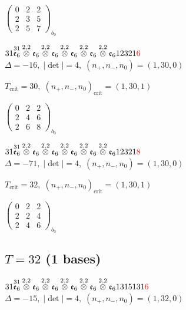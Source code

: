 \documentclass[10pt]{article}
\begin{document}
\hspace{2em}$\left(\begin{smallmatrix}0 & 2 & 2 \\ 2 & 3 & 5 \\ 2 & 5 & 7\end{smallmatrix}\right)_{\!b_0}$

$31\overset{31}{\mathfrak{e}_6}\overset{2,2}{\otimes}\mathfrak{e}_6\overset{2,2}{\otimes}\mathfrak{e}_6\overset{2,2}{\otimes}\mathfrak{e}_6\overset{2,2}{\otimes}\mathfrak{e}_6\overset{2,2}{\otimes}\mathfrak{e}_612321\textcolor{red}{6}$ \quad $\Delta=-16,\; |\det|=4,\; (n_+,n_-,n_0)=(1,30,0)$

\hspace{1em}$T_{\text{crit}}=30,\; (n_+,n_-,n_0)_{\text{crit}}=(1,30,1)$

\hspace{2em}$\left(\begin{smallmatrix}0 & 2 & 2 \\ 2 & 4 & 6 \\ 2 & 6 & 8\end{smallmatrix}\right)_{\!b_0}$

$31\overset{31}{\mathfrak{e}_6}\overset{2,2}{\otimes}\mathfrak{e}_6\overset{2,2}{\otimes}\mathfrak{e}_6\overset{2,2}{\otimes}\mathfrak{e}_6\overset{2,2}{\otimes}\mathfrak{e}_6\overset{2,2}{\otimes}\mathfrak{e}_612321\textcolor{red}{8}$ \quad $\Delta=-71,\; |\det|=4,\; (n_+,n_-,n_0)=(1,30,0)$

\hspace{1em}$T_{\text{crit}}=32,\; (n_+,n_-,n_0)_{\text{crit}}=(1,30,1)$

\hspace{2em}$\left(\begin{smallmatrix}0 & 2 & 2 \\ 2 & 2 & 4 \\ 2 & 4 & 6\end{smallmatrix}\right)_{\!b_0}$


\subsection*{$T = 32$ \quad (1 bases)}
\smallskip

$31\overset{31}{\mathfrak{e}_6}\overset{2,2}{\otimes}\mathfrak{e}_6\overset{2,2}{\otimes}\mathfrak{e}_6\overset{2,2}{\otimes}\mathfrak{e}_6\overset{2,2}{\otimes}\mathfrak{e}_6\overset{2,2}{\otimes}\mathfrak{e}_61315131\textcolor{red}{6}$ \quad $\Delta=-15,\; |\det|=4,\; (n_+,n_-,n_0)=(1,32,0)$
\end{document}
